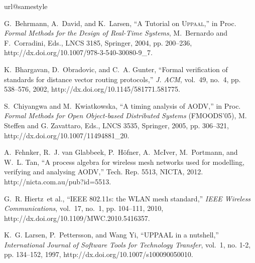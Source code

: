 \documentclass[conference,twoside]{IEEEtran}
\begin{document}

\begin{thebibliography}{10}
\providecommand{\url}[1]{#1}
\csname url@samestyle\endcsname
\providecommand{\newblock}{\relax}
\providecommand{\bibinfo}[2]{#2}
\providecommand{\BIBentrySTDinterwordspacing}{\spaceskip=0pt\relax}
\providecommand{\BIBentryALTinterwordstretchfactor}{4}
\providecommand{\BIBentryALTinterwordspacing}{\spaceskip=\fontdimen2\font plus
\BIBentryALTinterwordstretchfactor\fontdimen3\font minus
  \fontdimen4\font\relax}
\providecommand{\BIBforeignlanguage}[2]{{\expandafter\ifx\csname l@#1\endcsname\relax
\typeout{** WARNING: IEEEtranS.bst: No hyphenation pattern has been}\typeout{** loaded for the language `#1'. Using the pattern for}\typeout{** the default language instead.}\else
\language=\csname l@#1\endcsname
\fi
#2}}
\providecommand{\BIBdecl}{\relax}
\BIBdecl

G.~Behrmann, A.~David, and K.~Larsen, ``{A Tutorial on \textsc{Uppaal}},'' in
  Proc. \emph{Formal Methods for the Design of Real-Time Systems},
  M.~Bernardo and F.~Corradini, Eds., LNCS 3185, Springer, 2004, pp. 200--236,
  \url{http://dx.doi.org/10.1007/978-3-540-30080-9\_7}.

K.~Bhargavan, D.~Obradovic, and C.~A. Gunter, ``Formal verification of
  standards for distance vector routing protocols,'' \emph{J. ACM}, vol.~49,
  no.~4, pp. 538--576, 2002, \url{http://dx.doi.org/10.1145/581771.581775}.

S.~Chiyangwa and M.~Kwiatkowska, ``A timing analysis of {AODV},'' in
  Proc. \emph{Formal Methods for Open Object-based Distributed Systems} (FMOODS'05),
  M. Steffen and G. Zavattaro, Eds., LNCS 3535, Springer, 2005,
  pp. 306--321, \url{http://dx.doi.org/10.1007/11494881\_20}.

A.~Fehnker, R.~J. van Glabbeek, P.~H{\"o}fner, A.~McIver, M.~Portmann, and
  W.~L. Tan, ``A process algebra for wireless mesh networks used for modelling,
  verifying and analysing {AODV},'' Tech. Rep. 5513, NICTA, 2012.
  \url{http://nicta.com.au/pub?id=5513}.

G.~R. Hiertz~et al., ``{IEEE} 802.11s: the {WLAN} mesh standard,'' \emph{IEEE
  Wireless Communications}, vol.~17, no.~1, pp. 104--111, 2010,
  \url{http://dx.doi.org/10.1109/MWC.2010.5416357}.

K.~G. Larsen, P.~Pettersson, and {Wang Yi}, ``{UPPAAL} in a nutshell,''
  \emph{International Journal of Software Tools for Technology Transfer},
  vol.~1, no. 1-2, pp. 134--152, 1997,
  \url{http://dx.doi.org/10.1007/s100090050010}.


\end{thebibliography}
\end{document}
